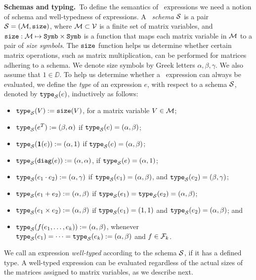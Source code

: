 \smallskip
\noindent
\textbf{Schemas and typing.}\,
To define the semantics of \lang\ expressions we need a notion of schema and well-typedness of expressions. A \lang\ \textit{schema} $\mathcal{S}$ is a pair $\mathcal{S}=(\mathcal{M},\texttt{size})$, where $\mathcal{M}\subset \mathcal{V}$ is a finite set of matrix variables, and $\texttt{size}: \mathcal{M} \mapsto \texttt{Symb}\times \texttt{Symb}$ is a function that maps each matrix variable in $\mathcal{M}$ to a pair of \textit{size symbols}. The $\texttt{size}$ function helps us determine whether certain matrix operations, such as matrix multiplication, can be performed for matrices adhering to a schema. 
We denote size symbols by Greek letters $\alpha,\beta,\gamma$. We also assume that $1\in \DD$. 
To help us determine whether a \lang\ expression can always be evaluated, we define the \textit{type} of an expression $e$, with respect to a schema $\mathcal{S}$, denoted by $\texttt{type}_{\mathcal{S}}(e)$, inductively as follows:
\begin{itemize}
\item $\texttt{type}_{\mathcal{S}}(V):= \texttt{size}(V)$, for a matrix variable $V\in\mathcal{M}$;
\item $\texttt{type}_{\mathcal{S}}(e^T):= (\beta,\alpha)$ if $\texttt{type}_{\mathcal{S}}(e)=(\alpha,\beta)$;
\item $\texttt{type}_{\mathcal{S}}(\mathbf{1}(e)):= (\alpha,1)$ if $\texttt{type}_{\mathcal{S}}(e)=(\alpha,\beta)$;
\item $\texttt{type}_{\mathcal{S}}(\texttt{diag}(e)):= (\alpha,\alpha)$, if $\texttt{type}_{\mathcal{S}}(e)=(\alpha,1)$;
\item $\texttt{type}_{\mathcal{S}}(e_1 \cdot e_2):= (\alpha,\gamma)$ if  $\texttt{type}_{\mathcal{S}}(e_1)=(\alpha,\beta)$, and $\texttt{type}_{\mathcal{S}}(e_2)=(\beta,\gamma)$;
\item $\texttt{type}_{\mathcal{S}}(e_1 + e_2):=(\alpha,\beta)$ if $\texttt{type}_{\mathcal{S}}(e_1)=\texttt{type}_{\mathcal{S}}(e_2)=(\alpha,\beta)$;
\item $\texttt{type}_{\mathcal{S}}(e_1\times e_2):=(\alpha,\beta)$ if $\texttt{type}_{\mathcal{S}}(e_1)=(1,1)$ and $\texttt{type}_{\mathcal{S}}(e_2)=(\alpha,\beta)$; and
\item $\texttt{type}_{\mathcal{S}}(f(e_1,\ldots ,e_k)):= (\alpha,\beta)$, whenever $\texttt{type}_{\mathcal{S}}(e_1) = \cdots = \texttt{type}_{\mathcal{S}}(e_k) := (\alpha,\beta)$ and $f\in\mathcal{F}_k$.
\end{itemize}
 We call an expression \textit{well-typed} according to the schema $\mathcal{S}$, if it has a defined type. 
A well-typed expression can be evaluated regardless of the actual sizes of the matrices assigned to matrix variables, as we describe next.

